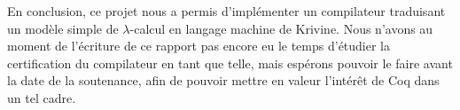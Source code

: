 \documentclass[a4paper,twoside,12pt]{article}
\begin{document}
\begin{conclusion}
\begin{paragraph}{}
En conclusion, ce projet nous a permis d'implémenter un compilateur traduisant un modèle simple de $\lambda$-calcul en langage machine de Krivine. Nous n'avons au moment de l'écriture de ce rapport pas encore eu le temps d'étudier la certification du compilateur en tant que telle, mais espérons pouvoir le faire avant la date de la soutenance, afin de pouvoir mettre en valeur l'intérêt de Coq dans un tel cadre.
\end{paragraph}
\end{conclusion}

\glsaddall
\printglossary[title={Glossaire\markright{GLOSSAIRE}}]
\end{document}
